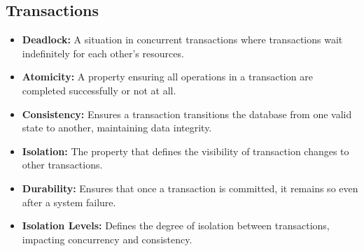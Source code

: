 \vspace{-0.3cm}
\subsection*{Transactions}
\vspace{-0.1cm}

\begin{itemize}[noitemsep,leftmargin=*]
\leftskip-\dimexpr\leftmargin %
\item[]{\textbf{Deadlock:} A situation in concurrent transactions where transactions wait indefinitely for each other's resources.}
\item[]{\textbf{Atomicity:} A property ensuring all operations in a transaction are completed successfully or not at all.}
\item[]{\textbf{Consistency:} Ensures a transaction transitions the database from one valid state to another, maintaining data integrity.}
\item[]{\textbf{Isolation:} The property that defines the visibility of transaction changes to other transactions.}
\item[]{\textbf{Durability:} Ensures that once a transaction is committed, it remains so even after a system failure.}
\item[]{\textbf{Isolation Levels:} Defines the degree of isolation between transactions, impacting concurrency and consistency.}
\end{itemize}

